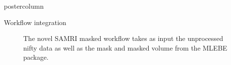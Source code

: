 \begin{frame}
\begin{columns}
\begin{column}{.42\textwidth}
\begin{beamercolorbox}[center]{postercolumn}
\begin{minipage}{.98\textwidth}
{\begin{myblock}{Workflow integration}
                                \begin{figure}
                                    \centering
                                    \caption{The novel SAMRI masked workflow takes as input the unprocessed nifty data as well as the mask and masked volume from the \textcolor{lg}{MLEBE} \cite{mlebe} package.}
                                \end{figure}
                            \end{myblock}\vfill

}
\end{minipage}
\end{beamercolorbox}
\end{column}
\end{columns}
\end{frame}
